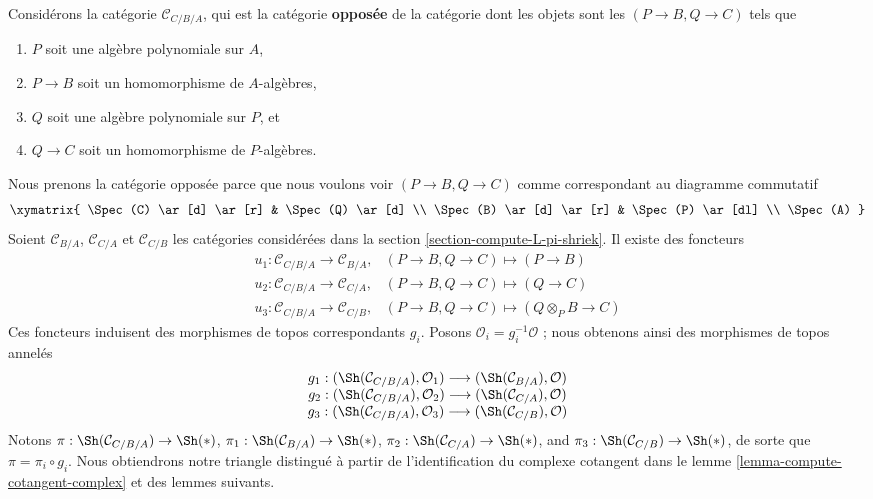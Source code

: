 \medskip\noindent
Considérons la catégorie $\mathcal{C}_{C/B/A}$, qui est la catégorie
{\bf opposée} de la catégorie dont les objets sont les
$(P \to B, Q \to C)$ tels que
\begin{enumerate}
\item $P$ soit une algèbre polynomiale sur $A$,
\item $P \to B$ soit un homomorphisme de $A$-algèbres,
\item $Q$ soit une algèbre polynomiale sur $P$, et
\item $Q \to C$ soit un homomorphisme de $P$-algèbres.
\end{enumerate}
Nous prenons la catégorie opposée parce que nous voulons voir
$(P \to B, Q \to C)$ comme correspondant au diagramme commutatif
$$
\xymatrix{
\Spec(C) \ar[d] \ar[r] & \Spec(Q) \ar[d] \\
\Spec(B) \ar[d] \ar[r] & \Spec(P) \ar[dl] \\
\Spec(A)
}
$$
Soient $\mathcal{C}_{B/A}$, $\mathcal{C}_{C/A}$ et $\mathcal{C}_{C/B}$
les catégories considérées dans la section
\ref{section-compute-L-pi-shriek}. Il existe des foncteurs
$$
\begin{matrix}
u_1 : \mathcal{C}_{C/B/A} \to \mathcal{C}_{B/A}, &
(P \to B, Q \to C) \mapsto (P \to B) \\
u_2 : \mathcal{C}_{C/B/A} \to \mathcal{C}_{C/A}, &
(P \to B, Q \to C) \mapsto (Q \to C) \\
u_3 : \mathcal{C}_{C/B/A} \to \mathcal{C}_{C/B}, &
(P \to B, Q \to C) \mapsto (Q \otimes_P B \to C)
\end{matrix}
$$
Ces foncteurs induisent des morphismes de topos correspondants $g_i$.
Posons $\mathcal{O}_i = g_i^{-1}\mathcal{O}$ ; nous obtenons ainsi des
morphismes de topos annelés
\begin{equation}
\label{equation-three-maps}
\begin{matrix}
g_1 : (\Sh(\mathcal{C}_{C/B/A}), \mathcal{O}_1)
\longrightarrow (\Sh(\mathcal{C}_{B/A}), \mathcal{O}) \\
g_2 : (\Sh(\mathcal{C}_{C/B/A}), \mathcal{O}_2)
\longrightarrow (\Sh(\mathcal{C}_{C/A}), \mathcal{O}) \\
g_3 : (\Sh(\mathcal{C}_{C/B/A}), \mathcal{O}_3)
\longrightarrow (\Sh(\mathcal{C}_{C/B}), \mathcal{O})
\end{matrix}
\end{equation}
Notons
$\pi : \Sh(\mathcal{C}_{C/B/A}) \to \Sh(*)$,
$\pi_1 : \Sh(\mathcal{C}_{B/A}) \to \Sh(*)$,
$\pi_2 : \Sh(\mathcal{C}_{C/A}) \to \Sh(*)$, and
$\pi_3 : \Sh(\mathcal{C}_{C/B}) \to \Sh(*)$,
de sorte que $\pi = \pi_i \circ g_i$. Nous obtiendrons notre triangle
distingué à partir de l'identification du complexe cotangent dans le lemme
\ref{lemma-compute-cotangent-complex} et des lemmes suivants.

